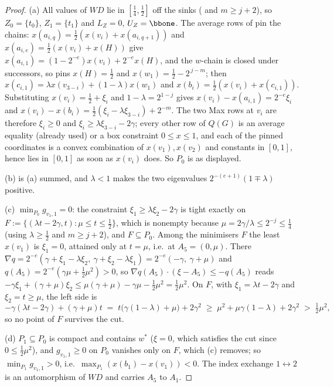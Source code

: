 \begin{proof}
(a) All values of $WD$ lie in $[\tfrac14,\tfrac12]$ off the sinks
( and $m\ge j+2$), so $Z_0=\{t_0\}$, $Z_1=\{t_1\}$ and
$L_Z=0$, $U_Z=\bbone$. The average rows of  pin the
chains: $x(a_{i,q})=\tfrac12(x(v_i)+x(a_{i,q+1}))$ and $x(a_{i,e})=\tfrac12(x(v_i)+x(H))$
give $x(a_{i,1})=(1-2^{-e})x(v_i)+2^{-e}x(H)$, and the $w$-chain is closed
under successors, so  pins $x(H)=\tfrac12$ and
$x(w_1)=\tfrac12-2^{\,j-m}$; then
$x(c_{i,1})=\lambda x(v_{3-i})+(1-\lambda)x(w_1)$ and
$x(b_i)=\tfrac12(x(v_i)+x(c_{i,1}))$. Substituting $x(v_i)=\tfrac12+\xi_i$ and
$1-\lambda=2^{1-j}$ gives
$x(v_i)-x(a_{i,1})=2^{-e}\xi_i$ and
$x(v_i)-x(b_i)=\tfrac12(\xi_i-\lambda\xi_{3-i})+2^{-m}$. The two Max rows at
$v_i$ are therefore $\xi_i\ge0$ and $\xi_i\ge\lambda\xi_{3-i}-2\gamma$; every
other row of $Q(G)$ is an average equality (already used) or a box constraint
$0\le x\le1$, and each of the pinned coordinates is a convex combination of
$x(v_1),x(v_2)$ and constants in $[0,1]$, hence lies in $[0,1]$ as soon as
$x(v_i)$ does. So $P_0$ is as displayed.

(b) is (a) summed, and $\lambda<1$ makes the two eigenvalues
$2^{-(e+1)}(1\mp\lambda)$ positive.

(c) $\min_{P_0}g_{v_1,1}=0$: the constraint $\xi_1\ge\lambda\xi_2-2\gamma$ is
tight exactly on $F:=\{(\lambda t-2\gamma,t):\mu\le t\le\tfrac12\}$, which is
nonempty because $\mu=2\gamma/\lambda\le2^{-j}\le\tfrac14$
(using $\lambda\ge\tfrac12$ and $m\ge j+2$), and $F\subseteq P_0$. Among the
minimisers $F$ the least $x(v_1)$ is $\xi_1=0$, attained only at $t=\mu$, i.e.\
at $A_5=(0,\mu)$. There $\nabla q=2^{-e}(\gamma+\xi_1-\lambda\xi_2,\
\gamma+\xi_2-\lambda\xi_1)=2^{-e}(-\gamma,\ \gamma+\mu)$ and
$q(A_5)=2^{-e}(\gamma\mu+\tfrac12\mu^{2})>0$, so
$\nabla q(A_5)\cdot(\xi-A_5)\le-q(A_5)$ reads
$-\gamma\xi_1+(\gamma+\mu)\xi_2\le\mu(\gamma+\mu)-\gamma\mu-\tfrac12\mu^{2}=\tfrac12\mu^{2}$.
On $F$, with $\xi_1=\lambda t-2\gamma$ and $\xi_2=t\ge\mu$, the left side is
\[
  -\gamma(\lambda t-2\gamma)+(\gamma+\mu)t
  \;=\;t\bigl(\gamma(1-\lambda)+\mu\bigr)+2\gamma^{2}
  \;\ge\;\mu^{2}+\mu\gamma(1-\lambda)+2\gamma^{2}\;>\;\tfrac12\mu^{2},
\]
so no point of $F$ survives the cut.

(d) $P_1\subseteq P_0$ is compact and contains $w^\ast$ ($\xi=0$, which
satisfies the cut since $0\le\tfrac12\mu^{2}$), and $g_{v_1,1}\ge0$ on $P_0$
vanishes only on $F$, which (c) removes; so $\min_{P_1}g_{v_1,1}>0$, i.e.\
$\max_{P_1}(x(b_1)-x(v_1))<0$. The index exchange $1\leftrightarrow2$ is an
automorphism of $WD$ and carries $A_5$ to $A_1$.
\end{proof}

